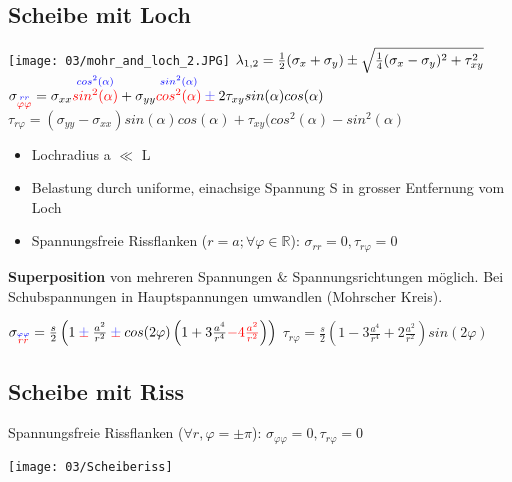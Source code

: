     \subsection{Scheibe mit Loch}
    \vspace{-0.5mm}
        \begin{center}
            \texttt{[image: 03/mohr\_and\_loch\_2.JPG]}
            $\tiny{\lambda_{1,2}= \frac{1}{2}(\sigma_x+\sigma_y)\pm\sqrt{\frac{1}{4}(\sigma_x-\sigma_y)^2+\tau_{xy}^2}}$\\
            $\sigma_{\overset{\textcolor{blue}{rr}}{\textcolor{red}{\varphi\varphi}}}=\sigma_{xx}\overset{\textcolor{blue}{cos^2(\alpha)}}{\textcolor{red}{sin^2(\alpha)}}+\sigma_{yy}\overset{\textcolor{blue}{sin^2(\alpha)}}{\textcolor{red}{cos^2(\alpha)}} \cpm 2\tau_{xy}sin(\alpha)cos(\alpha)$\\
            $\tau_{r\varphi}=(\sigma_{yy}-\sigma_{xx})sin(\alpha)cos(\alpha)+\tau_{xy}(cos^2(\alpha)-sin^2(\alpha)$
        \end{center}
        \begin{itemize}
            \item Lochradius a $\ll$ L
            \item Belastung durch uniforme, einachsige Spannung S in grosser Entfernung vom Loch
            \item Spannungsfreie Rissflanken ($r = a; \forall\varphi\in\mathbb{R} $): $\sigma_{rr}=0, \tau_{r\varphi}=0$
        \end{itemize}
        \textbf{Superposition} von mehreren Spannungen \& Spannungsrichtungen möglich. Bei Schubspannungen in Hauptspannungen umwandlen (Mohrscher Kreis).
        \begin{center}
            $\sigma_{\overset{\textcolor{blue}{\varphi\varphi}}{\textcolor{red}{rr}}}=\frac{s}{2}\left(1\cpm\frac{a^2}{r^2}\cpm cos(2\varphi)\left(1+3\frac{a^4}{r^4}\textcolor{red}{-4\frac{a^2}{r^2}}\right)\right)$
            $\tau_{r\varphi}=\frac{s}{2}\left(1-3\frac{a^4}{r^4}+2\frac{a^2}{r^2}\right)sin(2\varphi)$
        \end{center}
        
    \subsection{Scheibe mit Riss}
        Spannungsfreie Rissflanken ($\forall r, \varphi=\pm\pi$): $\sigma_{\varphi\varphi}=0, \tau_{r\varphi}=0$
        \begin{center}
            \vspace{-2mm}
            \texttt{[image: 03/Scheiberiss]}
        \end{center}
\vspace{-2mm}